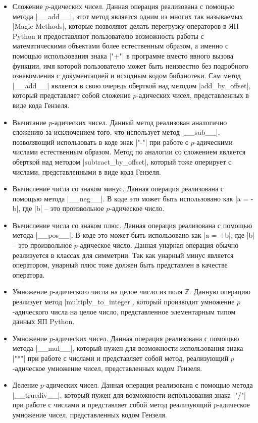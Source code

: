 \documentclass[master, och, times, pract]{sty/SCWorks}
\theoremstyle{plain}
\theoremstyle{definition}
\numberwithin{equation}{section}
\begin{document}
\begin{itemize}
\item Сложение $p$-адических чисел. Данная операция реализована с помощью метода |__add__|, этот метод является одним из многих так называемых |Magic Methods|, которые позволяют делать перегрузку операторов в ЯП Python и предоставляют пользователю возможность работы с математическими объектами более естественным образом, а именно с помощью использования знака |"+"| в программе вместо явного вызова функции, имя которой пользователю может быть неизвестно без подробного ознакомления с документацией и исходным кодом библиотеки. Сам метод |__add__| является в свою очередь оберткой над методом |add_by_offset|, который представляет собой сложение $p$-адических чисел, представленных в виде кода Гензеля.
\item Вычитание $p$-адических чисел. Данный метод реализован аналогично сложению за исключением того, что использует метод |__sub__|, позволяющий использовать в коде знак |"-"| при работе с $p$-адическими числами естественным образом. Метод по аналогии со сложением является оберткой над методом |subtract_by_offset|, который тоже оперирует с числами, представленными в виде кода Гензеля.
\item Вычисление числа со знаком минус. Данная операция реализована с помощью метода |__neg__|. В коде это может быть использовано как |a = -b|, где |b| -- это произвольное $p$-адическое число.
\item Вычисление числа со знаком плюс. Данная операция реализована с помощью метода |__pos__|. В коде это может быть использовано как |a = +b|, где |b| -- это произвольное $p$-адическое число. Данная унарная операция обычно реализуется в классах для симметрии. Так как унарный минус является оператором, унарный плюс тоже должен быть представлен в качестве оператора.
\item Умножение $p$-адического числа на целое число из поля $\mathbb{Z}$. Данную операцию реализует метод |multiply_to_integer|, который производит умножение $p$-адического числа на целое число, представленное элементарным типом данных ЯП Python.
\item Умножение $p$-адических чисел. Данная операция реализована с помощью метода |__mul__|, который нужен для возможности использования знака |"*"| при работе с числами и представляет собой метод, реализующий $p$-адическое умножение чисел, представленных кодом Гензеля.
\item Деление $p$-адических чисел. Данная операция реализована с помощью метода |__truediv__|, который нужен для возможности использования знака |"/"| при работе с числами и представляет собой метод реализующий $p$-адическое умножение чисел, представленных кодом Гензеля.

\end{itemize}
\end{document}
